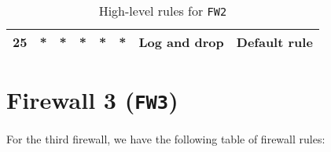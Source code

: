 \documentclass[a4paper, 11pt, oneside]{article}
\begin{document}
\begin{table}[H]
{\begin{tabular}{|llllllll|}
\multicolumn{1}{|l|}{25}                        & \multicolumn{1}{l|}{*}                                                            & \multicolumn{1}{l|}{*}                                                              & \multicolumn{1}{l|}{*}                                                                 & \multicolumn{1}{l|}{*}                                                                   & \multicolumn{1}{l|}{*}                 & \multicolumn{1}{l|}{Log and drop}    & Default rule                           \\ \hline
\end{tabular}
}
\caption{High-level rules for \texttt{FW2}}
\end{table}

\section{Firewall 3 (\texttt{FW3})}
\paragraph{}For the third firewall, we have the following table of firewall rules:
\end{document}
